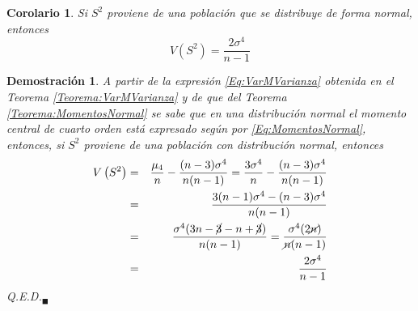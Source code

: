 \documentclass[a4paper,11pt]{article}
\theoremstyle{teoremas}
\newtheorem{corolario}[teorema]{Corolario}
\theoremstyle{ejemplos}
\theoremstyle{definiciones}
\theoremstyle{lemas}
\newtheorem*{demostracion}{Demostraci\'on}
\begin{document}
\begin{corolario}
 Si $S^2$ proviene de una poblaci\'on que se distribuye de forma normal, entonces
 \begin{equation}
  V\left( S^2 \right) = \frac{2\sigma^4}{n-1}
 \end{equation}
\end{corolario}

\begin{demostracion}
 A partir de la expresi\'on \ref{Eq:VarMVarianza} obtenida en el Teorema \ref{Teorema:VarMVarianza} y de que del Teorema \ref{Teorema:MomentosNormal} se sabe que en una distribuci\'on normal el momento central de cuarto orden est\'a expresado seg\'un por \ref{Eq:MomentosNormal}, entonces, si $S^2$ proviene de una poblaci\'on con distribuci\'on normal, entonces 
 \begin{eqnarray*}
  V\left( S^2 \right) & = & \frac{\mu_4}{n} - \frac{(n-3)\sigma^4}{n(n-1)} = \frac{3\sigma^4}{n} - \frac{(n-3)\sigma^4}{n(n-1)} \\ 
    & = & \frac{3(n-1)\sigma^4 - (n-3)\sigma^4}{n(n-1)} \\ 
    & = & \frac{\sigma^4(3n - \cancel{3} - n + \cancel{3})}{n(n-1)} = \frac{\sigma^4(2\cancel{n})}{\cancel{n}(n-1)} \\ 
    & = & \frac{2\sigma^4}{n-1}
 \end{eqnarray*}
 Q.E.D.${}_{\blacksquare}$
\end{demostracion}
\end{document}
